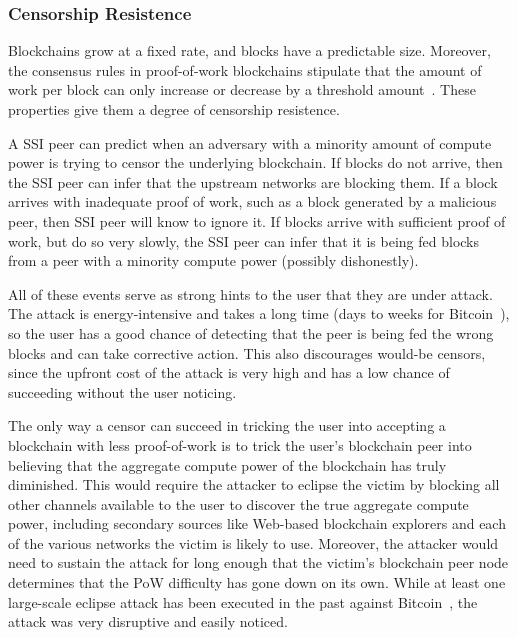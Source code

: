 \subsubsection{Censorship Resistence}

Blockchains grow at a fixed rate, and blocks have a predictable size.  Moreover,
the consensus rules in proof-of-work blockchains stipulate that 
the amount of work per block can only increase or decrease by a threshold
amount~\cite{bitcoin-difficulty-adjustment-rules}.  These properties give them a
degree of censorship resistence.

A SSI peer can predict when an adversary with a minority amount of compute power
is trying to censor the underlying blockchain.  If
blocks do not arrive, then the SSI peer can infer that the upstream
networks are blocking them.  If a block arrives with inadequate proof of work,
such as a block generated by a malicious peer, then SSI peer will know to ignore
it.  If blocks arrive with sufficient proof of work, but do so very slowly, the
SSI peer can infer that it is being fed blocks from a peer with a minority
compute power (possibly dishonestly).

All of these events serve as strong hints to the user that they are under
attack.  The attack is energy-intensive and takes a long time (days to weeks for
Bitcoin~\cite{bitcoin-difficulty-adjustment-rules}),
so the user has a good chance of detecting that the peer is being fed the wrong
blocks and can take corrective action.  This also discourages would-be censors,
since the upfront cost of the attack is very high and has a low chance of
succeeding without the user noticing.

The only way a censor can succeed in tricking the user into accepting a
blockchain with less proof-of-work
is to trick the user's blockchain peer into believing that the aggregate compute
power of the blockchain has truly diminished.  This would require the attacker
to eclipse the victim by blocking all other channels available to the user to discover the true aggregate
compute power, including secondary sources like Web-based blockchain explorers
and each of the various networks the victim is likely to use.
Moreover, the attacker would need to sustain the attack for long
enough that the victim's blockchain peer node determines that the PoW difficulty
has gone down on its own.  While at least one large-scale eclipse attack
has been executed in the past against
Bitcoin~\cite{bitcoin-bgp-attack}, the attack was very disruptive and easily
noticed.


